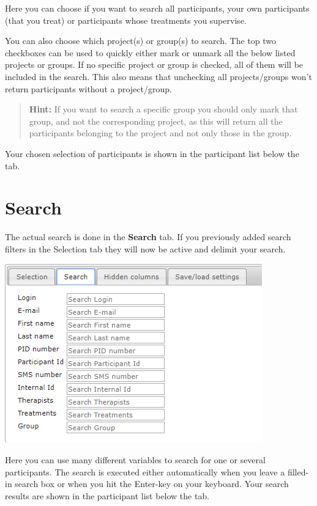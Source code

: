 \documentclass[]{book}
\begin{document}
Here you can choose if you want to search all participants, your own participants (that you treat) or participants whose treatments you supervise.

You can also choose which project(s) or group(s) to search. The top two checkboxes can be used to quickly either mark or unmark all the below listed projects or groups. If no specific project or group is checked, all of them will be included in the search. This also means that unchecking all projects/groups won't return participants without a project/group.

\begin{quote}
\textbf{Hint:} If you want to search a specific group you should only mark that group, and not the corresponding project, as this will return all the participants belonging to the project and not only those in the group.
\end{quote}

Your chosen selection of participants is shown in the participant list below the tab.

\hypertarget{search}{%
\section{Search}\label{search}}

The actual search is done in the \textbf{Search} tab. If you previously added search filters in the Selection tab they will now be active and delimit your search.

\includegraphics{images/search.png}

Here you can use many different variables to search for one or several participants. The search is executed either automatically when you leave a filled-in search box or when you hit the Enter-key on your keyboard. Your search results are shown in the participant list below the tab.
\end{document}

